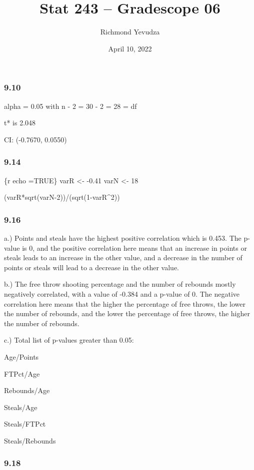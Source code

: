 \documentclass[
]{article}
\title{Stat 243 -- Gradescope 06}
\author{Richmond Yevudza}
\date{April 10, 2022}
\begin{document}
\maketitle

\hypertarget{section}{%
\subsubsection{9.10}\label{section}}

alpha = 0.05 with n - 2 = 30 - 2 = 28 = df

t* is 2.048

CI: (-0.7670, 0.0550)

\hypertarget{section-1}{%
\subsubsection{9.14}\label{section-1}}

\{r echo =TRUE\} varR \textless- -0.41 varN \textless- 18

(varR*sqrt(varN-2))/(sqrt(1-varR\^{}2))

\hypertarget{section-2}{%
\subsubsection{9.16}\label{section-2}}

a.) Points and steals have the highest positive correlation which is
0.453. The p-value is 0, and the positive correlation here means that an
increase in points or steals leads to an increase in the other value,
and a decrease in the number of points or steals will lead to a decrease
in the other value.

b.) The free throw shooting percentage and the number of rebounds mostly
negatively correlated, with a value of -0.384 and a p-value of 0. The
negative correlation here means that the higher the percentage of free
throws, the lower the number of rebounds, and the lower the percentage
of free throws, the higher the number of rebounds.

c.) Total list of p-values greater than 0.05:

Age/Points

FTPct/Age

Rebounds/Age

Steals/Age

Steals/FTPct

Steals/Rebounds

\hypertarget{section-3}{%
\subsubsection{9.18}\label{section-3}}
\end{document}
